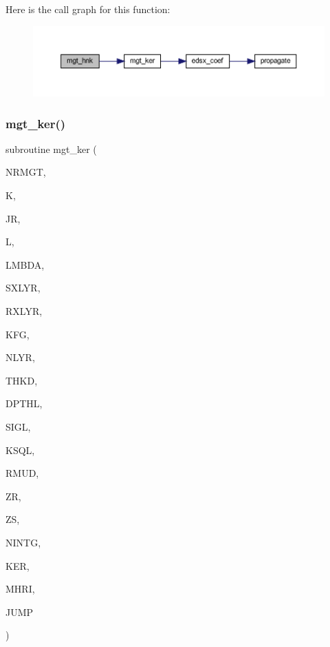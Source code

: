 Here is the call graph for this function\+:\nopagebreak
\begin{figure}[H]
\begin{center}
\leavevmode
\includegraphics[width=350pt]{Leroi__c_8f90_a8765868cf7e593af1ecbeadd492b6b49_cgraph}
\end{center}
\end{figure}
\mbox{\label{Leroi__c_8f90_ad35190cbd2113592b83c9f1e721b8d07}} 
\subsubsection{\texorpdfstring{mgt\+\_\+ker()}{mgt\_ker()}}
{\footnotesize\ttfamily subroutine mgt\+\_\+ker (\begin{DoxyParamCaption}\item[{integer}]{N\+R\+M\+GT,  }\item[{integer}]{K,  }\item[{integer}]{JR,  }\item[{integer}]{L,  }\item[{real(kind=ql)}]{L\+M\+B\+DA,  }\item[{integer}]{S\+X\+L\+YR,  }\item[{integer}]{R\+X\+L\+YR,  }\item[{integer}]{K\+FG,  }\item[{integer}]{N\+L\+YR,  }\item[{real(kind=ql), dimension (nlyr)}]{T\+H\+KD,  }\item[{real(kind=ql), dimension (nlyr)}]{D\+P\+T\+HL,  }\item[{complex(kind=ql), dimension (nlyr)}]{S\+I\+GL,  }\item[{complex(kind=ql), dimension (nlyr)}]{K\+S\+QL,  }\item[{real(kind=ql), dimension(0\+:nlyr)}]{R\+M\+UD,  }\item[{real(kind=ql)}]{ZR,  }\item[{real(kind=ql)}]{ZS,  }\item[{integer}]{N\+I\+N\+TG,  }\item[{complex(kind=ql), dimension(jnlo-\/nrmgt\+:jnhi,5)}]{K\+ER,  }\item[{complex(kind=ql), dimension(nrmgt,5)}]{M\+H\+RI,  }\item[{logical}]{J\+U\+MP }\end{DoxyParamCaption})}

